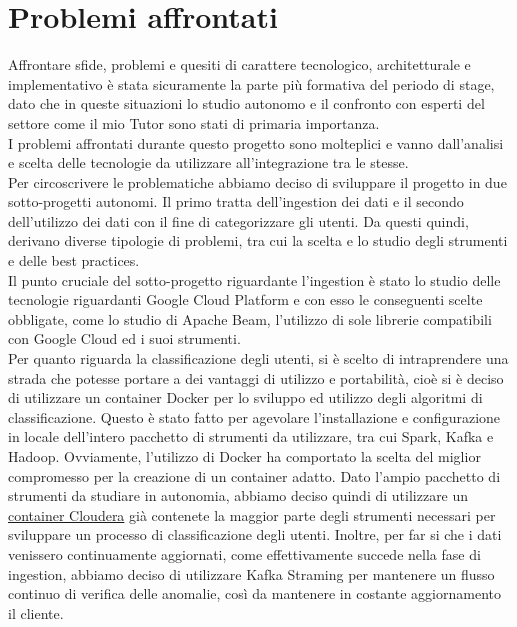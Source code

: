 \section{Problemi affrontati}
Affrontare sfide, problemi e quesiti di carattere tecnologico, architetturale e implementativo è stata sicuramente la parte più formativa del periodo di stage, dato che in queste situazioni lo studio autonomo e il confronto con esperti del settore come il mio Tutor sono stati di primaria importanza.
\\
I problemi affrontati durante questo progetto sono molteplici e vanno dall'analisi e scelta delle tecnologie da utilizzare all'integrazione tra le stesse.
\\
Per circoscrivere le problematiche abbiamo deciso di sviluppare il progetto in due sotto-progetti autonomi. 
Il primo tratta dell'ingestion dei dati e il secondo dell'utilizzo dei dati con il fine di categorizzare gli utenti. Da questi quindi, derivano diverse tipologie di problemi, tra cui la scelta e lo studio degli strumenti e delle \gls{best practices}.
\\
Il punto cruciale del sotto-progetto riguardante l'ingestion è stato lo studio delle tecnologie riguardanti Google Cloud Platform e con esso le conseguenti scelte obbligate, come lo studio di Apache Beam, l'utilizzo di sole librerie compatibili con Google Cloud ed i suoi strumenti.
\\
Per quanto riguarda la classificazione degli utenti, si è scelto di intraprendere una strada che potesse portare a dei vantaggi di utilizzo e portabilità, cioè si è deciso di utilizzare un \gls{container} Docker per lo sviluppo ed utilizzo degli algoritmi di classificazione.
Questo è stato fatto per agevolare l'installazione e configurazione in locale dell'intero pacchetto di strumenti da utilizzare, tra cui Spark, Kafka e Hadoop.
Ovviamente, l'utilizzo di Docker ha comportato la scelta del miglior compromesso per la creazione di un container adatto. Dato l'ampio pacchetto di strumenti da studiare in autonomia, abbiamo deciso quindi di utilizzare un \href{https://www.cloudera.com/documentation/enterprise/5-6-x/topics/quickstart_docker_container.html}{container Cloudera} già contenete la maggior parte degli strumenti necessari per sviluppare un processo di classificazione degli utenti.
Inoltre, per far si che i dati venissero continuamente aggiornati, come effettivamente succede nella fase di ingestion, abbiamo deciso di utilizzare Kafka Straming per mantenere un flusso continuo di verifica delle anomalie, così da mantenere in costante aggiornamento il cliente.

